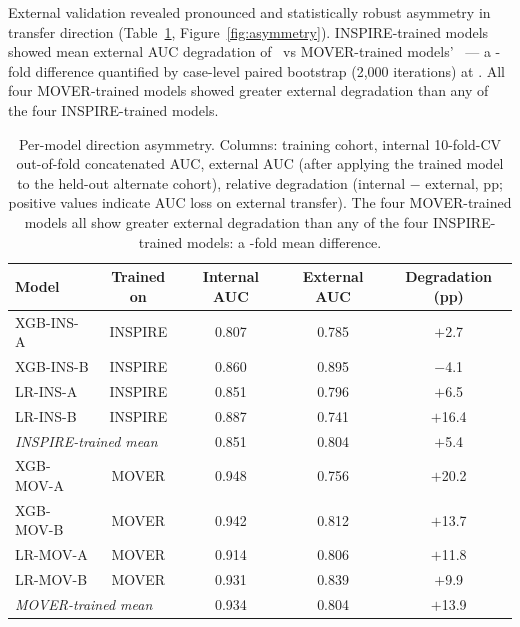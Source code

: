 External validation revealed pronounced and statistically robust asymmetry in transfer direction (Table~\ref{tab:asymmetry}, Figure~\ref{fig:asymmetry}). INSPIRE-trained models showed mean external AUC degradation of \pnMeanDegradationInspireTrainedPp\ vs MOVER-trained models' \pnMeanDegradationMoverTrainedPp\ --- a \pnDirectionAsymmetryRatioRound-fold difference quantified by case-level paired bootstrap (2,000 iterations) at \pnDirectionAsymmetryDiffPpFull. All four MOVER-trained models showed greater external degradation than any of the four INSPIRE-trained models.

\begin{table}[htbp]
\centering
\caption{Per-model direction asymmetry. Columns: training cohort,
internal 10-fold-CV out-of-fold concatenated AUC, external AUC (after
applying the trained model to the held-out alternate cohort), relative
degradation (internal $-$ external, pp; positive values indicate AUC loss
on external transfer). The four MOVER-trained models all show greater
external degradation than any of the four INSPIRE-trained models: a
\pnDirectionAsymmetryRatioRound-fold mean difference.}
\label{tab:asymmetry}
\setlength{\tabcolsep}{6pt}
\small
\begin{tabular}{lcccc}
\toprule
\textbf{Model} & \textbf{Trained on} & \textbf{Internal AUC} & \textbf{External AUC} & \textbf{Degradation (pp)} \\
\midrule
XGB-INS-A & INSPIRE &  0.807 & 0.785 &  $+$2.7 \\
XGB-INS-B & INSPIRE &  0.860 & 0.895 &  $-$4.1 \\
LR-INS-A  & INSPIRE &  0.851 & 0.796 &  $+$6.5 \\
LR-INS-B  & INSPIRE &  0.887 & 0.741 & $+$16.4 \\
\multicolumn{2}{l}{\textit{INSPIRE-trained mean}} & 0.851 & 0.804 &  $+$5.4 \\
\midrule
XGB-MOV-A & MOVER   &  0.948 & 0.756 & $+$20.2 \\
XGB-MOV-B & MOVER   &  0.942 & 0.812 & $+$13.7 \\
LR-MOV-A  & MOVER   &  0.914 & 0.806 & $+$11.8 \\
LR-MOV-B  & MOVER   &  0.931 & 0.839 &  $+$9.9 \\
\multicolumn{2}{l}{\textit{MOVER-trained mean}} & 0.934 & 0.804 & $+$13.9 \\
\bottomrule
\end{tabular}
\end{table}

